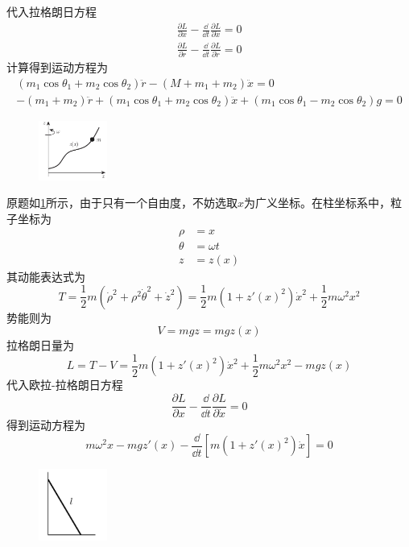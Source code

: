 \begin{solution}
	代入拉格朗日方程
	\begin{align*}
		\frac{\partial L}{\partial x}-\frac{\dd}{\dd t}\frac{\partial L}{\partial \dot{x}}=0\\
		\frac{\partial L}{\partial r}-\frac{\dd}{\dd t}\frac{\partial L}{\partial \dot{r}}=0
	\end{align*}
	计算得到运动方程为
	\begin{align*}
		(m_1\cos{\theta_1}+m_2\cos{\theta_2}) \ddot{r}-(M+m_1+m_2)\ddot{x}=0\\
		-(m_1+m_2)\ddot{r}+(m_1\cos{\theta_1}+m_2\cos{\theta_2})\ddot{x}+(m_1\cos{\theta_1}-m_2\cos{\theta_2})g=0
	\end{align*}
\end{solution}


\begin{solution}
    \begin{figure}[h]
    	\centering
    	\includegraphics[width=0.2\textwidth]{content/Figures/2-4}
    	\caption{ }
    	\label{fig:4-3}
    \end{figure}
    原题如\ref{fig:4-3}所示，由于只有一个自由度，不妨选取\(x\)为广义坐标。在柱坐标系中，粒子坐标为
    \begin{align*}
    	\rho&=x\\
    	\theta&=\omega t\\
    	z&=z(x)
    \end{align*}
    其动能表达式为
    \[T=\frac{1}{2}m(\dot{\rho}^2+\rho^2 \dot{\theta}^2+\dot{z}^2)=\frac{1}{2}m (1+z'(x)^2)\dot{x}^2+\frac{1}{2}m\omega^2 x^2\]
    势能则为
    \[V=mgz=mg z(x)\]
    拉格朗日量为
    \[L=T-V=\frac{1}{2}m (1+z'(x)^2)\dot{x}^2+\frac{1}{2}m\omega^2 x^2-mg z(x)\]
    代入欧拉-拉格朗日方程
    \[\frac{\partial L}{\partial x}-\frac{\dd}{\dd t}\frac{\partial L}{\partial \dot{x}}=0\]
    得到运动方程为
    \[m\omega^2 x-mgz'(x)-\frac{\dd}{\dd t}\left[m(1+z'(x)^2)\dot{x}\right]=0\]
\end{solution}


\begin{figure}[h]
	\centering
	\includegraphics[width=0.2\textwidth]{content/Figures/4-4}
	\caption{ }
	\label{fig:4-4}
\end{figure}

